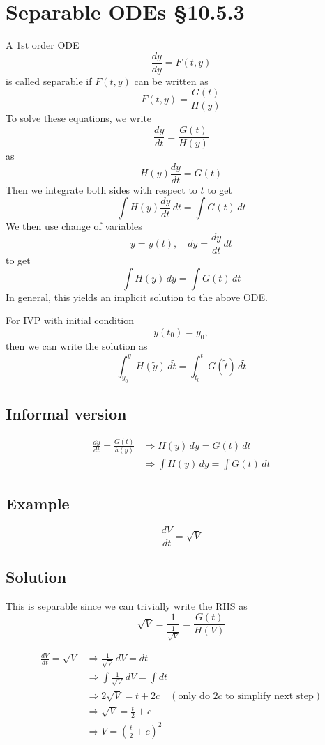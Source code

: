 \documentclass[11pt]{article}
\begin{document}
\section{Separable ODEs §10.5.3}
A 1st order ODE
\[ \frac{dy}{dy} = F(t, y) \]
is called separable if $F(t,y)$ can be written as
\[ F(t, y) = \frac{G(t)}{H(y)} \]
To solve these equations, we write
\[ \frac{dy}{dt} = \frac{G(t)}{H(y)} \]
as
\[ H(y) \frac{dy}{dt} = G(t) \]
Then we integrate both sides with respect to $t$ to get
\[ \int H(y) \frac{dy}{dt}\, dt = \int G(t)\, dt \]
We then use change of variables
\[ y = y(t),\quad dy = \frac{dy}{dt}\, dt \]
to get
\[ \int H(y)\, dy = \int G(t)\, dt \]
In general, this yields an implicit solution to the above ODE.

For IVP with initial condition
\[ y(t_0) = y_0, \]
then we can write the solution as
\[ \int_{y_0}^y H(\tilde{y})\, d\tilde{t} = \int_{t_0}^t G(\tilde{t})\, d\tilde{t} \]

\subsection{Informal version}
\begin{align*}
\frac{dy}{dt} = \frac{G(t)}{h(y)} &\Rightarrow H(y)\, dy = G(t) \, dt \\
&\Rightarrow \int H(y)\, dy = \int G(t) \, dt
\end{align*}

\subsection{Example}
\[ \frac{dV}{dt}= \sqrt{V} \] 

\subsection{Solution}
This is separable since we can trivially write the RHS as
\[ \sqrt{V} = \frac{1}{\frac{1}{\sqrt{V}}} = \frac{G(t)}{H(V)} \]

\begin{align*}
\frac{dV}{dt} = \sqrt{V} &\Rightarrow \frac{1}{\sqrt{V}}\, dV = dt \\
&\Rightarrow \int \frac{1}{\sqrt{V}}\, dV = \int dt \\
&\Rightarrow 2\sqrt{V} = t + 2c \quad (\text{only do } 2c \text{ to simplify next step}) \\
&\Rightarrow \sqrt{V} = \frac{t}{2} + c \\
&\Rightarrow V = \left( \frac{t}{2} + c \right)^2
\end{align*}
\end{document}

